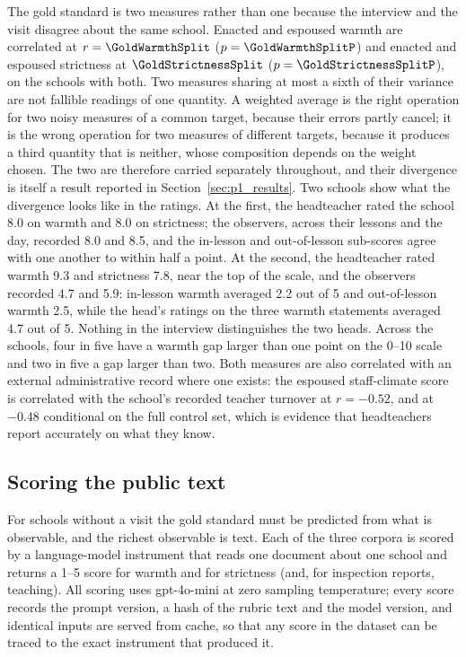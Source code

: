The gold standard is two measures rather than one because the interview and
the visit disagree about the same school. Enacted and espoused warmth are
correlated at $r = \GoldWarmthSplit$ ($p = \GoldWarmthSplitP$) and enacted and
espoused strictness at $\GoldStrictnessSplit$ ($p = \GoldStrictnessSplitP$),
on the \NTierOne{} schools with both. Two measures sharing at most a sixth of
their variance are not fallible readings of one quantity. A weighted average
is the right operation for two noisy measures of a common target, because
their errors partly cancel; it is the wrong operation for two measures of
different targets, because it produces a third quantity that is neither,
whose composition depends on the weight chosen. The two are therefore carried
separately throughout, and their divergence is itself a result reported in
Section~\ref{sec:p1_results}. Two schools show what the divergence looks like
in the ratings. At the first, the headteacher rated the school 8.0 on warmth
and 8.0 on strictness; the observers, across their lessons and the day,
recorded 8.0 and 8.5, and the in-lesson and out-of-lesson sub-scores agree
with one another to within half a point. At the second, the headteacher rated
warmth 9.3 and strictness 7.8, near the top of the scale, and the observers
recorded 4.7 and 5.9: in-lesson warmth averaged 2.2 out of 5 and out-of-lesson
warmth 2.5, while the head's ratings on the three warmth statements averaged
4.7 out of 5. Nothing in the interview distinguishes the two heads. Across the
\NTierOne{} schools, four in five have a warmth gap larger than one point on
the 0--10 scale and two in five a gap larger than two. Both measures are also
correlated with an external administrative record where one exists: the
espoused staff-climate score is correlated with the school's recorded teacher
turnover at $r = -0.52$, and at $-0.48$ conditional on the full control set,
which is evidence that headteachers report accurately on what they know.

\subsection{Scoring the public text}

For schools without a visit the gold standard must be predicted from what is
observable, and the richest observable is text. Each of the three corpora is
scored by a language-model instrument that reads one document about one
school and returns a 1--5 score for warmth and for strictness (and, for
inspection reports, teaching). All scoring uses gpt-4o-mini at zero
sampling temperature; every score records the prompt version, a hash of the
rubric text and the model version, and identical inputs are served from
cache, so that any score in the dataset can be traced to the exact instrument
that produced it.

